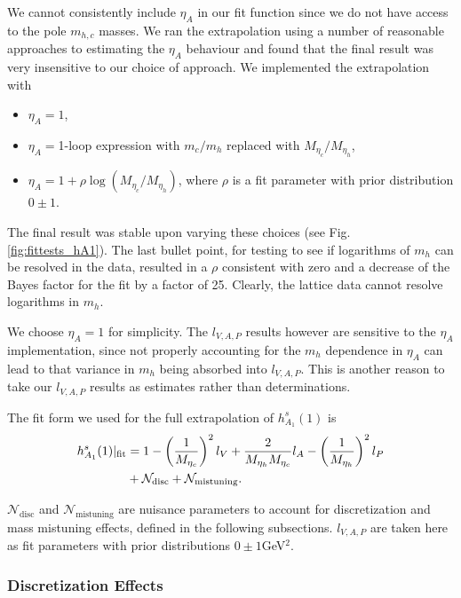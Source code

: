 We cannot consistently include $\eta_A$ in our fit function since we do not have access to the pole $m_{h,c}$ masses. We ran the extrapolation using a number of reasonable approaches to estimating the $\eta_A$ behaviour and found that the final result was very insensitive to our choice of approach. We implemented the extrapolation with
\begin{itemize}
\item
  $\eta_A=1$,
\item
  $\eta_A = $1-loop expression with $m_c/m_h$ replaced with $M_{\eta_c}/M_{\eta_h}$,
\item
  $\eta_A = 1 + \rho \log(M_{\eta_c}/M_{\eta_h})$, where $\rho$ is a fit parameter with prior distribution $0\pm 1$.
\end{itemize}

The final result was stable upon varying these choices (see Fig. \ref{fig:fittests_hA1}). The last bullet point, for testing to see if logarithms of $m_h$ can be resolved in the data, resulted in a $\rho$ consistent with zero and a decrease of the Bayes factor for the fit by a factor of 25. Clearly, the lattice data cannot resolve logarithms in $m_h$.

We choose $\eta_A=1$ for simplicity. The $l_{V,A,P}$ results however are sensitive to the $\eta_A$ implementation, since not properly accounting for the $m_h$ dependence in $\eta_A$ can lead to that variance in $m_h$ being absorbed into $l_{V,A,P}$. This is another reason to take our $l_{V,A,P}$ results as estimates rather than determinations.

The fit form we used for the full extrapolation of $h_{A_1}^s(1)$ is
\begin{align}
  h^s_{A_1}(1)|_{\text{fit}} &= 1 - \left({1\over M_{\eta_c}}\right)^2 l_V + {2\over M_{\eta_h}M_{\eta_c}} l_A- \left({1\over M_{\eta_h}}\right)^2 l_P  \nonumber \\ &+ \mathcal{N}_{\text{disc}} + \mathcal{N}_{\text{mistuning}}.
  \label{eq:fitform_BsDsstar}
\end{align}

$\mathcal{N}_{\text{disc}}$ and $\mathcal{N}_{\text{mistuning}}$ are nuisance parameters to account for discretization and mass mistuning effects, defined in the following subsections. $l_{V,A,P}$ are taken here as fit parameters with prior distributions $0\pm 1 $GeV$^2$.

\subsubsection{Discretization Effects}

